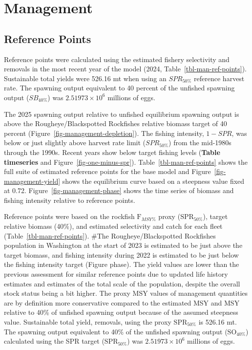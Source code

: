 \documentclass[
]{scrartcl}
\begin{document}
\newpage{}

\section{Management}\label{management}

\subsection{Reference Points}\label{reference-points-1}

Reference points were calculated using the estimated fishery selectivity
and removals in the most recent year of the model (2024,
Table~\ref{tbl-man-ref-points}). Sustainable total yields were 526.16 mt
when using an \(SPR_{50\%}\) reference harvest rate. The spawning output
equivalent to 40 percent of the unfished spawning output (\(SB_{40\%}\))
was \ensuremath{2.51973\times 10^{6}} millions of eggs.

The 2025 spawning output relative to unfished equilibrium spawning
output is above the Rougheye/Blackspotted Rockfishes relative biomass
target of 40 percent (Figure~\ref{fig-management-depletion}). The
fishing intensity, \(1-SPR\), was below or just slightly above harvest
rate limit (\(SPR_{50\%}\)) from the mid-1980s through the 1990s. Recent
years show below target fishing levels (\textbf{Table timeseries} and
Figure~\ref{fig-one-minus-spr}). Table~\ref{tbl-man-ref-points} shows
the full suite of estimated reference points for the base model and
Figure~\ref{fig-management-yield} shows the equilibrium curve based on a
steepness value fixed at 0.72. Figure~\ref{fig-management-phase} shows
the time series of biomass and fishing intensity relative to reference
points.

Reference points were based on the rockfish \(\text{F}_{MSY\%}\) proxy
(\(\text{SPR}_{50\%}\)), target relative biomass (40\%), and estimated
selectivity and catch for each fleet (Table~\ref{tbl-man-ref-points}).
\#The Rougheye/Blackspotted Rockfishes population in Washington at the
start of 2023 is estimated to be just above the target biomass, and
fishing intensity during 2022 is estimated to be just below the fishing
intensity target (Figure phase). The yield values are lower than the
previous assessment for similar reference points due to updated life
history estimates and estimates of the total scale of the population,
despite the overall stock status being a bit higher. The proxy MSY
values of management quantities are by definition more conservative
compared to the estimated MSY and MSY relative to 40\% of unfished
spawning output because of the assumed steepness value. Sustainable
total yield, removals, using the proxy \(\text{SPR}_{50\%}\) is 526.16
mt. The spawning output equivalent to 40\% of the unfished spawning
output (\(\text{SO}_{40\%}\)) calculated using the SPR target
(\(\text{SPR}_{50\%}\)) was \ensuremath{2.51973\times 10^{6}} millions
of eggs.
\end{document}
